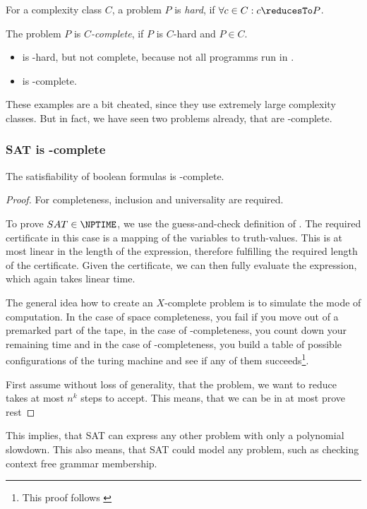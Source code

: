 \begin{defn}
	For a complexity class $C$, a problem $P$ is \emph{hard}, if 
	$\forall c\in C: c \reducesTo P$.

	The problem $P$ is \emph{$C$-complete}, if $P$ is $C$-hard and $P\in C$.
\end{defn}
\begin{example}
	\begin{itemize}
		\item \FOR is \PTIME-hard, but not complete, because not all \FOR programms run in \PTIME.
		\item \TM is \WHILE-complete.
	\end{itemize}
\end{example}
These examples are a bit cheated, since they use extremely large complexity 
classes. But in fact, we have seen two problems already, that are \NPTIME-complete.

\subsubsection{SAT is \NPTIME-complete}
\begin{theorem}
	The satisfiability of boolean formulas is \NPTIME-complete.
\end{theorem}
\begin{proof}
	For completeness, inclusion and universality are required.

	To prove $SAT\in \NPTIME$, we use the guess-and-check definition of 
	\NPTIME. The required certificate in this case is a mapping of the variables to 
	truth-values. This is at most linear in the length of the expression, 
	therefore fulfilling the required \PSPACE length of the certificate. Given the 
	certificate, we can then fully evaluate the expression, which again takes 
	linear time.

	The general idea how to create an $X$-complete problem is to simulate the 
	mode of computation. In the case of space completeness, you fail if you 
	move out of a premarked part of the tape, in the case of 
	\PTIME-completeness, you count down your remaining time and in the case of 
	\NPTIME-completeness, you build a table of possible configurations of the 
	turing machine and see if any of them succeeds\footnote{This proof follows 
	\cite{sipser2006introduction}}.

	First assume without loss of generality, that the problem, we want to reduce
	takes at most $n^k$ steps to accept. This means, that we can be in at most 
	\TODO prove rest
\end{proof}
This implies, that SAT can express any other \NPTIME problem with only a 
polynomial slowdown. This also means, that SAT could model any \PTIME 
problem, such as checking context free grammar membership.

